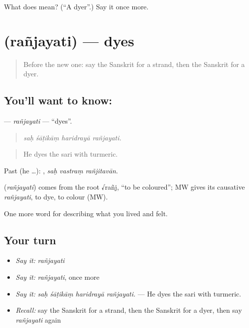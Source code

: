 \begin{tcolorbox}[breakable,colback=teal!4,colframe=teal!35!black,title={Before you move on}]
What does  mean? (\textquotedblleft{}A dyer\textquotedblright{}.) Say it once more.
\end{tcolorbox}
\section[\texorpdfstring{\sk{रञ्जयति} (rañjayati)}{रञ्जयति (rañjayati)}]{ (rañjayati) — dyes}

\label{lesson:SA-C506-ranjayati}



\begin{quote}
Before the new one: say the Sanskrit for a strand, then the Sanskrit for a dyer.
\end{quote}

\subsection*{You'll want to know: }
\textbf{} — \emph{rañjayati} — \textquotedblleft{}dyes\textquotedblright{}.

\begin{quote}
   
\end{quote}

\begin{quote}
\emph{saḥ śāṭikāṃ haridrayā rañjayati.}
\end{quote}

\begin{quote}
He dyes the sari with turmeric.
\end{quote}

Past (he …):   , \emph{saḥ vastraṃ rañjitavān}.

\begin{cousinweb}
\textbf{} (\emph{rañjayati}) comes from the root √rañj, \textquotedblleft{}to be coloured\textquotedblright{}; MW gives its causative \emph{rañjayati}, to dye, to colour (MW).
\end{cousinweb}

\begin{grammarlens}[title={What you've built}]
One more word for describing what you lived and felt.
\end{grammarlens}

\subsection*{Your turn}
\begin{itemize}
\raggedright
  \item \emph{Say it:} \emph{rañjayati}
  \item \emph{Say it:} \emph{rañjayati}, once more
  \item \emph{Say it:} \emph{saḥ śāṭikāṃ haridrayā rañjayati.} — He dyes the sari with turmeric.
  \item \emph{Recall:} say the Sanskrit for a strand, then the Sanskrit for a dyer, then say \emph{rañjayati} again
\end{itemize}

